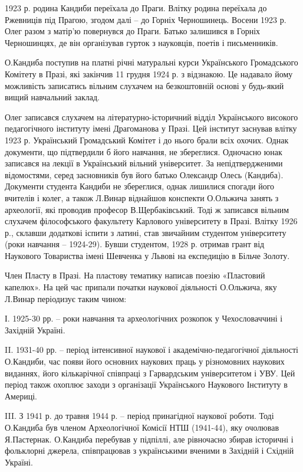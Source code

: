 1923 р. родина Кандиби переїхала до Праги. Влітку родина переїхала до Ржевниців
під Прагою, згодом далі – до Горніх Черношинець. Восени 1923 р. Олег разом з
матір'ю повернувся до Праги. Батько залишився в Горніх Черношинцях, де він
організував гурток з науковців, поетів і письменників.

О.Кандиба поступив на платні річні матуральні курси Українського Громадського
Комітету в Празі, які закінчив 11 грудня 1924 р. з відзнакою. Це надавало йому
можливість записатись вільним слухачем на безкоштовній основі у будь-який вищий
навчальний заклад.

Олег записався слухачем на літературно-історичний відділ Українського високого
педагогічного інституту імені Драгоманова у Празі. Цей інститут заснував влітку
1923 р. Український Громадський Комітет і до нього брали всіх охочих. Однак
документи, що підтвердили б його навчання, не збереглися. Одночасно юнак
записався на лекції в Український вільний університет. За непідтвердженими
відомостями, серед засновників був його батько Олександр Олесь (Кандиба).
Документи студента Кандиби не збереглися, однак лишилися спогади його вчителів
і колег, а також Л.Винар віднайшов конспекти О.Ольжича занять з археології, які
проводив професор В.Щербаківський. Тоді ж записався вільним слухачем
філософського факультету Карлового університету в Празі. Влітку 1926 р.,
склавши додаткові іспити з латині, став звичайним студентом університету (роки
навчання – 1924-29). Бувши студентом, 1928 р. отримав грант від Наукового
Товариства імені Шевченка у Львові на експедицію в Більче Золоту.

Член Пласту в Празі. На пластову тематику написав поезію «Пластовий капелюх».
На цей час припали початки наукової діяльності О.Ольжича, яку Л.Винар
періодизує таким чином:

І. 1925-30 рр. – роки навчання та археологічних розкопок у Чехословаччині і Західній Україні.

II. 1931-40 рр. – період інтенсивної наукової і академічно-педагогічної
діяльності О.Кандиби, час появи його основних наукових праць у різномовних
наукових виданнях, його кількарічної співпраці з Гарвардським університетом і
УВУ. Цей період також охоплює заходи з організації Українського Наукового
Інституту в Америці.

III. З 1941 р. до травня 1944 р. – період принагідної наукової роботи. Тоді
О.Кандиба був членом Археологічної Комісії НТШ (1941-44), яку очолював
Я.Пастернак. О.Кандиба перебував у підпіллі, але рівночасно збирав історичні і
фольклорні джерела, співпрацював з українськими вченими в Західній і Східній
Україні.

